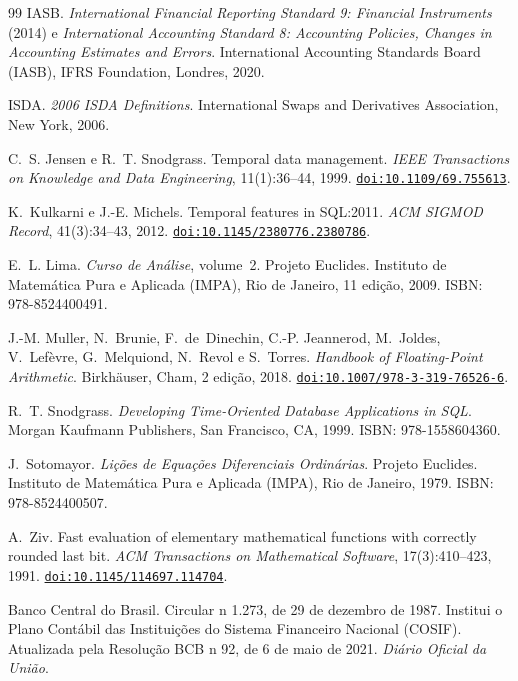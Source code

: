 \documentclass[11pt, a4paper]{article}
\newcommand{\doi}[1]{\href{https://doi.org/#1}{\texttt{doi:#1}}}
\theoremstyle{definition}
\theoremstyle{plain}
\theoremstyle{remark}
\begin{document}
\begin{thebibliography}{99}
IASB.
\newblock \emph{International Financial Reporting Standard 9: Financial Instruments} (2014) e \emph{International Accounting Standard 8: Accounting Policies, Changes in Accounting Estimates and Errors}.
\newblock International Accounting Standards Board (IASB), IFRS Foundation, Londres, 2020.

ISDA.
\newblock \emph{2006 ISDA Definitions}.
\newblock International Swaps and Derivatives Association, New York, 2006.

C.~S. Jensen e R.~T. Snodgrass.
\newblock Temporal data management.
\newblock \emph{IEEE Transactions on Knowledge and Data Engineering}, 11(1):36--44, 1999.
\newblock \doi{10.1109/69.755613}.

K.~Kulkarni e J.-E. Michels.
\newblock Temporal features in {SQL:2011}.
\newblock \emph{ACM SIGMOD Record}, 41(3):34--43, 2012.
\newblock \doi{10.1145/2380776.2380786}.

E.~L. Lima.
\newblock \emph{Curso de An{\'a}lise}, volume~2.
\newblock Projeto Euclides. Instituto de Matem{\'a}tica Pura e Aplicada (IMPA), Rio de Janeiro, 11{\textordfeminine} edi{\c{c}}{\~a}o, 2009.
\newblock ISBN: 978-8524400491.

J.-M. Muller, N.~Brunie, F.~de~Dinechin, C.-P. Jeannerod, M.~Joldes, V.~Lef{\`e}vre, G.~Melquiond, N.~Revol e S.~Torres.
\newblock \emph{Handbook of Floating-Point Arithmetic}.
\newblock Birkh{\"a}user, Cham, 2{\textordfeminine} edi{\c{c}}{\~a}o, 2018.
\newblock \doi{10.1007/978-3-319-76526-6}.

R.~T. Snodgrass.
\newblock \emph{Developing Time-Oriented Database Applications in SQL}.
\newblock Morgan Kaufmann Publishers, San Francisco, CA, 1999.
\newblock ISBN: 978-1558604360.

J.~Sotomayor.
\newblock \emph{Li{\c{c}}{\~o}es de Equa{\c{c}}{\~o}es Diferenciais Ordin{\'a}rias}.
\newblock Projeto Euclides. Instituto de Matem{\'a}tica Pura e Aplicada (IMPA), Rio de Janeiro, 1979.
\newblock ISBN: 978-8524400507.

A.~Ziv.
\newblock Fast evaluation of elementary mathematical functions with correctly rounded last bit.
\newblock \emph{ACM Transactions on Mathematical Software}, 17(3):410--423, 1991.
\newblock \doi{10.1145/114697.114704}.

Banco Central do Brasil.
\newblock Circular n{\textordmasculine} 1.273, de 29 de dezembro de 1987. Institui o Plano Cont{\'a}bil das Institui{\c{c}}{\~o}es do Sistema Financeiro Nacional (COSIF).
\newblock Atualizada pela Resolu{\c{c}}{\~a}o BCB n{\textordmasculine} 92, de 6 de maio de 2021. \emph{Di{\'a}rio Oficial da Uni{\~a}o}.


\end{thebibliography}
\end{document}
